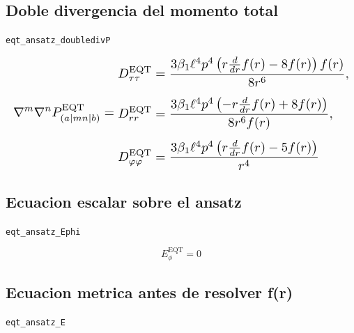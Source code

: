 \documentclass[11pt,a4paper]{article}
\begin{document}
\subsection{Doble divergencia del momento total}

\noindent\texttt{eqt\_ansatz\_doubledivP}\par\nopagebreak[4]

\[
\resizebox{\textwidth}{!}{$\displaystyle \nabla^m\nabla^nP^{\mathrm{EQT}}_{(a|mn|b)} = \begin{aligned}&D^{\mathrm{EQT}}_{\tau\tau}=\frac{3 \beta_{1} \ell^{4} p^{4} \left(r \frac{d}{d r} f{\left(r \right)} - 8 f{\left(r \right)}\right) f{\left(r \right)}}{8 r^{6}},\\[4pt]&D^{\mathrm{EQT}}_{rr}=\frac{3 \beta_{1} \ell^{4} p^{4} \left(- r \frac{d}{d r} f{\left(r \right)} + 8 f{\left(r \right)}\right)}{8 r^{6} f{\left(r \right)}},\\[4pt]&D^{\mathrm{EQT}}_{\varphi\varphi}=\frac{3 \beta_{1} \ell^{4} p^{4} \left(r \frac{d}{d r} f{\left(r \right)} - 5 f{\left(r \right)}\right)}{r^{4}}\end{aligned}$}
\]

\subsection{Ecuacion escalar sobre el ansatz}

\noindent\texttt{eqt\_ansatz\_Ephi}\par\nopagebreak[4]

\[
E^{\mathrm{EQT}}_\phi = 0
\]

\subsection{Ecuacion metrica antes de resolver f(r)}

\noindent\texttt{eqt\_ansatz\_E}\par\nopagebreak[4]
\end{document}
